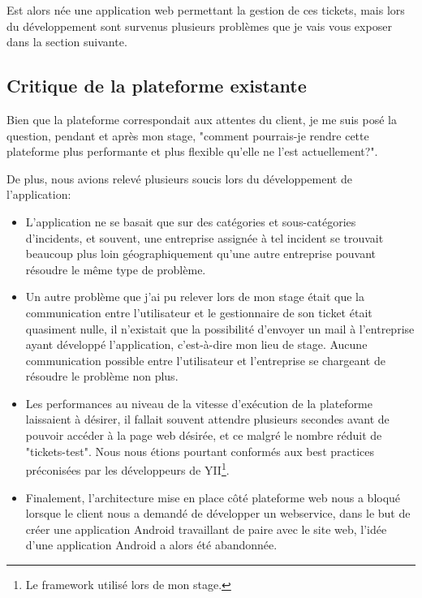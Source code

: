 \documentclass[12pt,table,a4paper]{report}
\begin{document}
Est alors née une application web permettant la gestion de ces tickets, mais lors du développement sont survenus plusieurs problèmes que je vais vous exposer dans la section suivante.

\subsection{Critique de la plateforme existante}
Bien que la plateforme correspondait aux attentes du client, je me suis posé la question, pendant et après mon stage, "comment pourrais-je rendre cette plateforme plus performante et plus flexible qu'elle ne l'est actuellement?".

De plus, nous avions relevé plusieurs soucis lors du développement de l'application:

\begin{itemize}
	\item{L'application ne se basait que sur des catégories et sous-catégories d'incidents, et souvent, une entreprise assignée à tel incident se trouvait beaucoup plus loin géographiquement qu'une autre entreprise pouvant résoudre le même type de problème.}

	\item{Un autre problème que j'ai pu relever lors de mon stage était que la communication entre l'utilisateur et le gestionnaire de son ticket était quasiment nulle, il n'existait que la possibilité d'envoyer un mail à l'entreprise ayant développé l'application, c'est-à-dire mon lieu de stage. Aucune communication possible entre l'utilisateur et l'entreprise se chargeant de résoudre le problème non plus.}

	\item{Les performances au niveau de la vitesse d'exécution de la plateforme laissaient à désirer, il fallait souvent attendre plusieurs secondes avant de pouvoir accéder à la page web désirée, et ce malgré le nombre réduit de "tickets-test". Nous nous étions pourtant conformés aux best practices préconisées par les développeurs de YII\footnote{Le framework utilisé lors de mon stage.}.}

	\item{Finalement, l'architecture mise en place côté plateforme web nous a bloqué lorsque le client nous a demandé de développer un webservice, dans le but de créer une application Android travaillant de paire avec le site web, l'idée d'une application Android a alors été abandonnée.}
\end{itemize}
\end{document}
